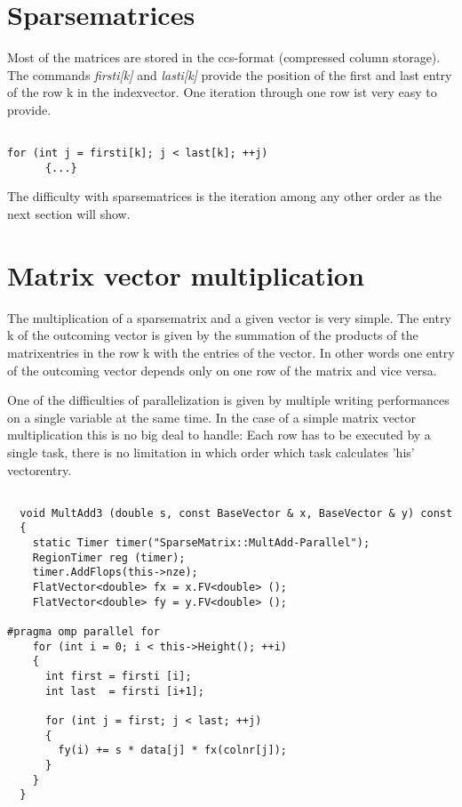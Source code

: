 \documentclass[a4paper,11pt]{scrartcl}
\begin{document}
\section{Sparsematrices}

Most of the matrices are stored in the ccs-format (compressed column storage).
 The commands {\em firsti[k]} and {\em lasti[k]} provide the position of the
 first and last entry of the row k in the indexvector. One
 iteration through one row ist very easy to provide.

\begin{lstlisting}

for (int j = firsti[k]; j < last[k]; ++j)
      {...}

\end{lstlisting}

The difficulty with sparsematrices is the iteration among any other order as 
the next section will show.

\section{Matrix vector multiplication}

The multiplication of a sparsematrix and a given vector is very simple. 
The entry k of the outcoming vector is given by the summation of the products 
of the matrixentries in the row k with the entries of the vector. In other 
words one entry of the outcoming vector depends only on one row of the matrix 
and vice versa.

One of the difficulties of parallelization is given by multiple writing 
performances on a single variable at the same time. In the case of a simple
 matrix vector multiplication this is no big deal to handle: Each row has to be
executed by a single task, there is no limitation in which order which task
 calculates 'his' vectorentry.

\begin{lstlisting}

  void MultAdd3 (double s, const BaseVector & x, BaseVector & y) const
  {
    static Timer timer("SparseMatrix::MultAdd-Parallel");
    RegionTimer reg (timer);
    timer.AddFlops(this->nze);
    FlatVector<double> fx = x.FV<double> ();
    FlatVector<double> fy = y.FV<double> ();

#pragma omp parallel for
    for (int i = 0; i < this->Height(); ++i)
    {
      int first = firsti [i];
      int last  = firsti [i+1];

      for (int j = first; j < last; ++j)
      {
        fy(i) += s * data[j] * fx(colnr[j]);
      }
    }
  }

\end{lstlisting}
\end{document}
